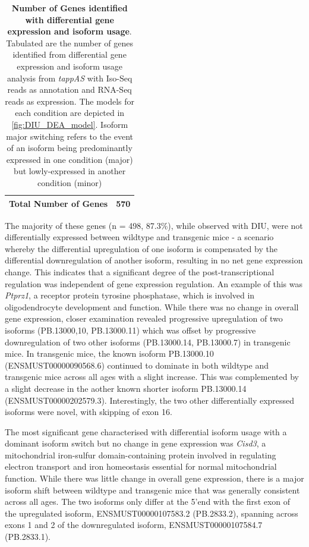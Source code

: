 \begin{table}[!htp]
\begin{tabularx}{0.85\textwidth}{cccc}
		\multicolumn{3}{c}{Total Number of Genes}                                                                                                                                                                            & 570                              \\ \bottomrule
	\end{tabularx}
	\caption[Number of Genes identified with differential gene expression and isoform usage]%
	{\textbf{Number of Genes identified with differential gene expression and isoform usage}. Tabulated are the number of genes identified from differential gene expression and isoform usage analysis from \textit{tappAS} with Iso-Seq reads as annotation and RNA-Seq reads as expression. The models for each condition are depicted in \cref{fig:DIU_DEA_model}. Isoform major switching refers to the event of an isoform being predominantly expressed in one condition (major) but lowly-expressed in another condition (minor)}
	\label{tab:DIU_DEA_nums}
\end{table}

The majority of these genes (n = 498, 87.3\%), while observed with DIU, were not differentially expressed between wildtype and transgenic mice - a scenario whereby the differential upregulation of one isoform is compensated by the differential downregulation of another isoform, resulting in no net gene expression change. This indicates that a significant degree of the post-transcriptional regulation was independent of gene expression regulation. An example of this was \textit{Ptprz1}, a receptor protein tyrosine phosphatase, which is involved in oligodendrocyte development and function. While there was no change in overall gene expression, closer examination revealed progressive upregulation of two isoforms (PB.13000,10, PB.13000.11) which was offset by progressive downregulation of two other isoforms (PB.13000.14, PB.13000.7) in transgenic mice. In transgenic mice, the known isoform PB.13000.10 (ENSMUST00000090568.6) continued to dominate in both wildtype and transgenic mice across all ages with a slight increase. This was complemented by a slight decrease in the aother known shorter isoform PB.13000.14 (ENSMUST00000202579.3). Interestingly, the two other differentially expressed isoforms were novel, with skipping of exon 16. 

The most significant gene characterised with differential isoform usage with a dominant isoform switch but no change in gene expression was \textit{Cisd3}, a mitochondrial iron-sulfur domain-containing protein involved in regulating electron transport and iron homeostasis essential for normal mitochondrial function. While there was little change in overall gene expression, there is a major isoform shift between wildtype and transgenic mice that was generally consistent across all ages. The two isoforms only differ at the 5'end with the first exon of the upregulated isoform, ENSMUST00000107583.2 (PB.2833.2), spanning across exons 1 and 2 of the downregulated isoform, ENSMUST00000107584.7 (PB.2833.1). 


